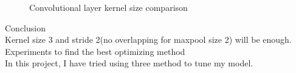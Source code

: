 \documentclass[11pt, a4paper]{article} %
\begin{document}
\begin{figure}[H]
  \centering
  \hfill
  \caption{Convolutional layer kernel size comparison}
\end{figure}
{\Large Conclusion}
\\ Kernel size 3 and stride 2(no overlapping for maxpool size 2) will be enough. \newline \break
{\Large Experiments to find the best optimizing method}
\\ In this project, I have tried using three method to tune my model.
\end{document}
